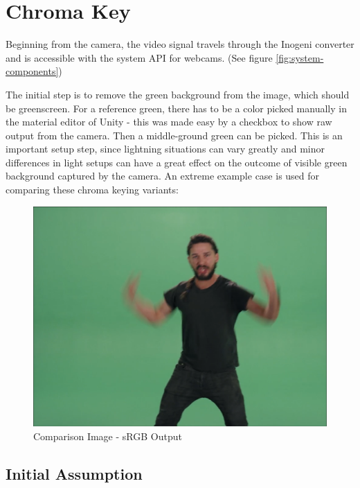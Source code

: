 %
\section{Chroma Key}

Beginning from the camera, the video signal travels through the Inogeni 
converter and is accessible with the system API for webcams. 
(See figure \ref{fig:system-components})

The initial step is to remove the green background from the image, which should 
be greenscreen. For a reference green, there has to be a color picked 
manually in the material editor of Unity - this was made easy by a checkbox to 
show raw output from the camera. Then a middle-ground green can be 
picked. This is an important setup step, since lightning situations can vary 
greatly and minor differences in light setups can have a great effect on the 
outcome of visible green background captured by the camera.
\newline
An extreme example case is used for comparing these chroma keying variants:

\begin{figure}[htb]
	\includegraphics[width=\textwidth]{_raw_resources/Comparison_Example.png}
	\caption{Comparison Image \cite{vimeo:shia:2015} - sRGB Output}
	\label{fig:chroma:color}
\end{figure}

\subsection{Initial Assumption}

